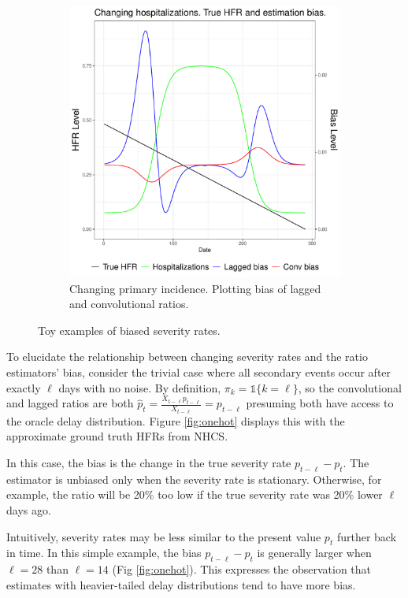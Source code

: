 \documentclass{article}
\renewcommand{\hat}{\widehat} %
\begin{document}
\begin{figure}
\begin{subfigure}[b]{0.45\linewidth}
         \includegraphics[width=\linewidth]{Figs/Simulated/sim_chging_primary.pdf}
         \caption{Changing primary incidence. Plotting bias of lagged and convolutional ratios.}
         \label{fig:chging_primary}
     \end{subfigure}
        \caption{Toy examples of biased severity rates.}
        \label{fig:bias_ex}
\end{figure}


To elucidate the relationship between changing severity rates and the ratio estimators' bias, consider the trivial case where all secondary events occur after exactly $\ell$ days with no noise. By definition, $\pi_k = \mathds{1}\{k=\ell\}$, so the convolutional and lagged ratios are both $\hat{p}_t = \frac{X_{t-\ell}p_{t-\ell}}{X_{t-\ell}} = p_{t-\ell}$ presuming both have access to the oracle delay distribution. Figure \ref{fig:onehot} displays this with the approximate ground truth HFRs from NHCS. 

In this case, the bias is the change in the true severity rate $p_{t-\ell} - p_t$. The estimator is unbiased only when the severity rate is stationary. Otherwise, for example, the ratio will be 20\% too low if the true severity rate was 20\% lower $\ell$ days ago. 

Intuitively, severity rates may be less similar to the present value $p_t$ further back in time. In this simple example, the bias $p_{t-\ell}-p_t$ is generally larger when $\ell=28$ than $\ell=14$ (Fig \ref{fig:onehot}). This expresses the observation that estimates with heavier-tailed delay distributions tend to have more bias. 
\end{document}
